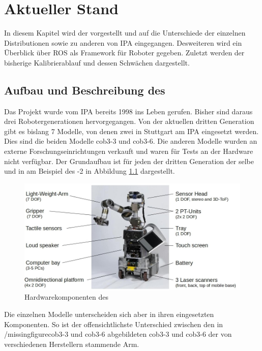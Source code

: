 \chapter{Aktueller Stand}

In diesem Kapitel wird der \cob vorgestellt und auf die Unterschiede der
einzelnen Distributionen sowie zu anderen von \ac{IPA} eingegangen. Desweiteren
wird ein Überblick über \ac{ROS} als Framework für Roboter gegeben. Zuletzt
werden der bisherige Kalibrierablauf und dessen Schwächen dargestellt.

\section{Aufbau und Beschreibung des \cob}

Das Projekt \cob wurde vom \ac{IPA} bereits 1998 ins Leben gerufen. Bisher sind
daraus drei Robotergenerationen hervorgegangen. Von der aktuellen dritten
Generation gibt es bislang 7 Modelle, von denen zwei in Stuttgart am \ac{IPA}
eingesetzt werden. Dies sind die beiden Modelle cob3-3 und cob3-6. Die anderen
Modelle wurden an externe Forschungseinrichtungen verkauft und waren für Tests
an der Hardware nicht verfügbar. Der Grundaufbau ist für jeden \cob der dritten
Generation der selbe und in  am Beispiel des -2 in Abbildung \ref{setup} dargestellt.

\begin{figure}[ht]
\centering
\includegraphics[width=\textwidth]{images/hw_setup_with_text}
\caption{Hardwarekomponenten des \cob}
\label{setup}
\end{figure}

  Die einzelnen Modelle unterscheiden sich aber in ihren
eingesetzten Komponenten. So ist der offensichtlichste Unterschied zwischen
den in /missingfigure{cob3-3 und cob3-6} abgebildeten cob3-3 und cob3-6 der von verschiedenen Herstellern stammende Arm. 

